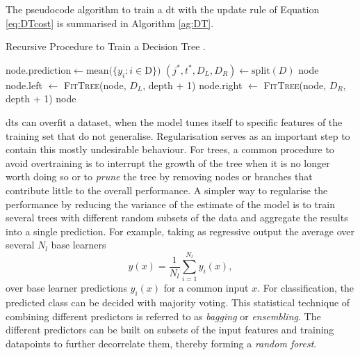 The pseudocode algorithm to train a \gls{dt} with the update rule of Equation \ref{eq:DTcost} is summarised in Algorithm \ref{ag:DT}. 

\begin{algorithm}
    \caption{Recursive Procedure to Train a Decision Tree \cite{MurphyML}.}
    \begin{algorithmic}
        \State $\text{node.prediction} \gets \text{mean}(\{y_i : i \in $D$\})$ 
        \State $(j^*, t^*, D_L, D_R) \gets \text{split}(D)$
            \State \Return node
        \Else
            \State node.left $\gets$ \textsc{FitTree}(node, $D_L$, depth + 1)
            \State node.right $\gets$ \textsc{FitTree}(node, $D_R$, depth + 1)
            \State \Return node
        \EndIf
    \EndFunction
    \end{algorithmic}
    \label{ag:DT}
\end{algorithm}

\glspl{dt} can overfit a dataset, when the model tunes itself to specific features of the training set that do not generalise. Regularisation serves as an important step to contain this mostly undesirable behaviour. For trees, a common procedure to avoid overtraining is to interrupt the growth of the tree when it is no longer worth doing so or to \textit{prune} the tree by removing nodes or branches that contribute little to the overall performance. A simpler way to regularise the performance by reducing the variance of the estimate of the model is to train several trees with different random subsets of the data and aggregate the results into a single prediction. For example, taking as regressive output the average over several $N_l$ base learners \[ y(x) = \frac{1}{N_l} \sum_{i=1}^{N_l} y_i(x),\] over base learner predictions $y_i(x)$ for a common input $x$. For classification, the predicted class can be decided with majority voting. This statistical technique of combining different predictors is referred to as \textit{bagging} or \textit{ensembling}. The different predictors can be built on subsets of the input features and training datapoints to further decorrelate them, thereby forming a \textit{random forest}.

